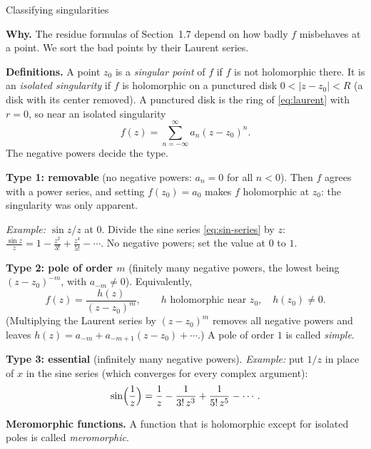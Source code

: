 \documentclass[11pt]{beamer}
\begin{document}
\begin{frame}[allowframebreaks=1.00]{Classifying singularities}
\footnotesize

\textbf{Why.} The residue formulas of Section~1.7 depend on how badly \(f\) misbehaves at a point.
We sort the bad points by their Laurent series.

\textbf{Definitions.} A point \(z_0\) is a \emph{singular point} of \(f\) if \(f\) is not holomorphic
there. It is an \emph{isolated singularity} if \(f\) is holomorphic on a punctured disk
\(0<|z-z_0|<R\) (a disk with its center removed). A punctured disk is the ring of \eqref{eq:laurent}
with \(r=0\), so near an isolated singularity
\[
 f(z)=\sum_{n=-\infty}^{\infty}a_n(z-z_0)^n .
\]
The negative powers decide the type.
\par\framebreak\par
\textbf{Type 1: removable} (no negative powers: \(a_n=0\) for all \(n<0\)). Then \(f\) agrees with a power
series, and setting \(f(z_0)=a_0\) makes \(f\) holomorphic at \(z_0\): the singularity was only apparent.

\emph{Example:} \(\sin z/z\) at \(0\). Divide the sine series \eqref{eq:sin-series} by \(z\):
\(\frac{\sin z}{z}=1-\frac{z^2}{3!}+\frac{z^4}{5!}-\cdots\). No negative powers; set the value at \(0\) to \(1\).

\textbf{Type 2: pole of order \(m\)} (finitely many negative powers, the lowest being \((z-z_0)^{-m}\),
with \(a_{-m}\ne0\)). Equivalently,
\[
 f(z)=\frac{h(z)}{(z-z_0)^m},\qquad h\text{ holomorphic near }z_0,\quad h(z_0)\ne0 .
\]
(Multiplying the Laurent series by \((z-z_0)^m\) removes all negative powers and leaves
\(h(z)=a_{-m}+a_{-m+1}(z-z_0)+\cdots\).) A pole of order \(1\) is called \emph{simple}.

\textbf{Type 3: essential} (infinitely many negative powers). \emph{Example:} put \(1/z\) in place of
\(x\) in the sine series (which converges for every complex argument):
\[
 \sin\Bigl(\frac1z\Bigr)=\frac1z-\frac1{3!\,z^3}+\frac1{5!\,z^5}-\cdots .
\]
\par\framebreak\par
\textbf{Meromorphic functions.} A function that is holomorphic except for isolated poles is called
\emph{meromorphic}.


\end{frame}
\end{document}
